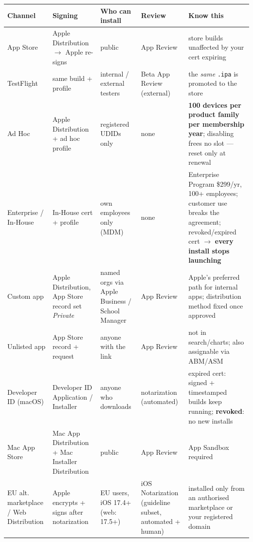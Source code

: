 \documentclass[8pt]{extarticle}
\newcommand\ct[1]{\texttt{#1}}
\begin{document}
\vspace{2pt}
{\footnotesize{}
\noindent\begin{tabular}{@{}>{\raggedright\arraybackslash}p{21mm}>{\raggedright\arraybackslash}p{24mm}>{\raggedright\arraybackslash}p{27mm}>{\raggedright\arraybackslash}p{20mm}>{\raggedright\arraybackslash}p{58mm}@{}}
\toprule
\textbf{Channel} & \textbf{Signing} & \textbf{Who can install} & \textbf{Review} & \textbf{Know this} \\ \midrule
App Store & Apple Distribution $\to$ Apple re-signs & public & App Review & store builds unaffected by your cert expiring \\
TestFlight & same build + profile & internal / external testers & Beta App Review (external) & the \emph{same} \ct{.ipa} is promoted to the store \\
Ad Hoc & Apple Distribution + ad hoc profile & registered UDIDs only & none & \textbf{100 devices per product family per membership year}; disabling frees no slot — reset only at renewal \\
Enterprise / In-House & In-House cert + profile & own employees only (MDM) & none & Enterprise Program \$299/yr, 100+ employees; customer use breaks the agreement; revoked/expired cert $\to$ \textbf{every install stops launching} \\
Custom app & Apple Distribution, App Store record set \emph{Private} & named orgs via Apple Business / School Manager & App Review & Apple's preferred path for internal apps; distribution method fixed once approved \\
Unlisted app & App Store record + request & anyone with the link & App Review & not in search/charts; also assignable via ABM/ASM \\
Developer ID (macOS) & Developer ID Application / Installer & anyone who downloads & notarization (automated) & expired cert: signed + timestamped builds keep running; \textbf{revoked}: no new installs \\
Mac App Store & Mac App Distribution + Mac Installer Distribution & public & App Review & App Sandbox required \\
EU alt. marketplace / Web Distribution & Apple encrypts + signs after notarization & EU users, iOS 17.4+ (web: 17.5+) & iOS Notarization (guideline subset, automated + human) & installed only from an authorised marketplace or your registered domain \\
\bottomrule
\end{tabular}}
\end{document}
